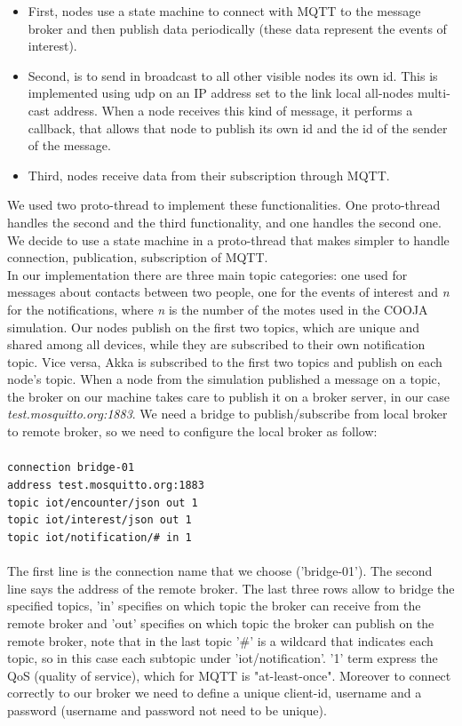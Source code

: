 \documentclass[10pt]{article}
\begin{document}
	\begin{itemize}
		\item 	First,  nodes use a state machine to connect with MQTT to the message broker and then publish data periodically (these data represent the events of interest).    
		\item   Second,	 is to send in broadcast to all other visible nodes its own id. This is implemented using udp on an IP address set to the link local all-nodes multi-cast address. When a node receives this kind of message, it performs a callback, that allows that node to publish its own id and the id of the sender of the message.
		\item	Third, nodes receive data from their subscription through MQTT.	
	\end{itemize}
	We used two proto-thread to implement these functionalities. One proto-thread handles the second and the third functionality, and one handles the second one. We decide to use a state machine in a proto-thread that makes simpler to handle connection, publication, subscription of MQTT. \\
	In our implementation there are three main topic categories: one used for messages about contacts between two people, one for the events of interest and \textit{n} for the notifications, where \textit{n} is the number of the motes used in the COOJA simulation. Our nodes publish on the first two topics, which are unique and shared among all devices, while they are subscribed to their own notification topic. Vice versa, Akka is subscribed to the first two topics and publish on each node's topic. When a node from the simulation published a message on a topic, the broker on our machine takes care to publish it on a broker server, in our case \textit{test.mosquitto.org:1883}. 
	We need a bridge to publish/subscribe from local broker to remote broker, so we need to configure the local broker as follow:\\
	\\
	\texttt{connection bridge-01 \\
		address test.mosquitto.org:1883 \\
		topic iot/encounter/json out 1 \\
		topic iot/interest/json out 1 \\
		topic iot/notification/\# in 1  \\}
	\\
	The first line is the connection name that we choose ('bridge-01'). The second line says the address of the remote broker. The last three rows allow to bridge the specified topics, 'in' specifies on which topic the broker can receive from the remote broker and 'out' specifies on which topic the broker can publish on the remote broker, note that in the last topic '\#' is a wildcard that indicates each topic, so in this case each subtopic under 'iot/notification'. '1' term express the QoS (quality of service), which for MQTT is "at-least-once". Moreover to connect correctly to our broker we need to define a unique client-id, username and a password (username and password not need to be unique). 
	
\end{document}
